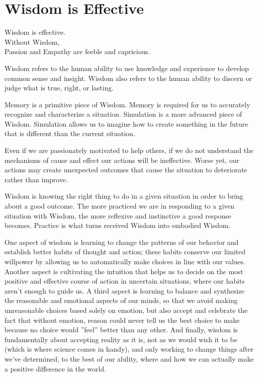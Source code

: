 \documentclass[ebook,12pt,openany,twoside]{memoir}
\newcommand{\tab}{\hspace*{2em}}
\begin{document}
\chapter{Wisdom is Effective}

\setlength\epigraphwidth{3.8in}
\epigraph{
  Wisdom is effective.\\
  Without Wisdom,\\
  \tab Passion and Empathy are feeble and capricious.
}{}

Wisdom refers to the human ability to use knowledge and experience to develop
common sense and insight. Wisdom also refers to the human ability to discern or
judge what is true, right, or lasting.

Memory is a primitive piece of Wisdom. Memory is required for us to accurately recognize and characterize a situation.  Simulation is a more advanced piece of Wisdom. Simulation allows us to imagine how to create something in the future that is different than the current situation.

Even if we are passionately motivated to help others, if we do not understand the mechanisms of cause and effect our actions will be ineffective.  Worse yet, our actions may create unexpected outcomes that cause the situation to deteriorate rather than improve.

Wisdom is knowing the right thing to do in a given situation in order to bring about a good outcome.  The more practiced we are in responding to a given situation with Wisdom, the more reflexive and instinctive a good response becomes.  Practice is what turns received Wisdom into embodied Wisdom.

One aspect of wisdom is learning to change the patterns of our behavior
and establish better habits of thought and action; these habits conserve our
limited willpower by allowing us to automatically make choices in line with our
values. Another aspect is cultivating the intuition that helps us to decide on
the most positive and effective course of action in uncertain situations, where
our habits aren't enough to guide us. A third aspect is learning to balance and
synthesize the reasonable and emotional aspects of our minds, so that we avoid
making unreasonable choices based solely on emotion, but also accept and
celebrate the fact that without emotion, reason could never tell us the best
choice to make because no choice would ''feel'' better than any other. And
finally, wisdom is fundamentally about accepting reality as it is, not as we
would wish it to be (which is where science comes in handy), and only working
to change things after we've determined, to the best of our ability, where and
how we can actually make a positive difference in the world.
\end{document}
